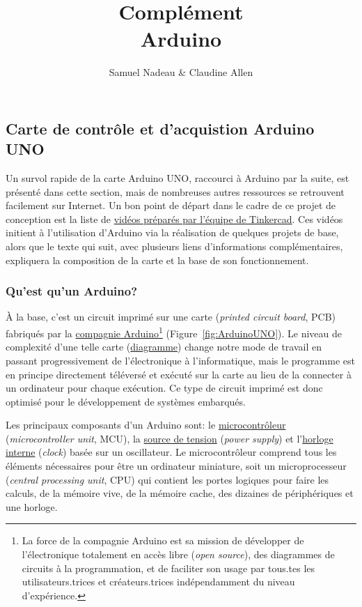 \documentclass[canadien,12pt,oneside,letterpaper]{article}
\begin{document}
\title{\textbf{Complément}\\Arduino}
\author{Samuel Nadeau \& Claudine Allen}
\date{}
\maketitle

\subsection*{Carte de contrôle et d'acquistion Arduino UNO}
Un survol rapide de la carte Arduino UNO, raccourci à Arduino par la suite, est présenté dans cette section, mais de nombreuses autres ressources se retrouvent facilement sur Internet. Un bon point de départ dans le cadre de ce projet de conception est la liste de \href{https://www.youtube.com/playlist?list=PLV6cmKvnKRs5geApVORPW79U6s3wpa0Ht}{vidéos préparés par l'équipe de Tinkercad}. Ces vidéos initient à l'utilisation d'Arduino via la réalisation de quelques projets de base, alors que le texte qui suit, avec plusieurs liens d'informations complémentaires, expliquera la composition de la carte et la base de son fonctionnement. 

\subsubsection*{Qu'est qu'un Arduino?}
À la base, c'est un circuit imprimé sur une carte (\textit{printed circuit board}, PCB) fabriqués par la \href{https://www.arduino.cc/}{ compagnie Arduino}\footnote{La force de la compagnie Arduino est sa mission de développer de l'électronique totalement en accès libre (\textit{open source}), des diagrammes de circuits à la programmation, et de faciliter son usage par tous.tes les utilisateurs.trices et créateurs.trices indépendamment du niveau d'expérience.} (Figure~\ref{fig:ArduinoUNO}). Le niveau de complexité d'une telle carte (\href{https://content.arduino.cc/assets/UNO-TH_Rev3e_sch.pdf}{diagramme}) change notre mode de travail en passant progressivement de l'électronique à l'informatique, mais le programme est en principe directement téléversé et exécuté sur la carte au lieu de la connecter à un ordinateur pour chaque exécution. Ce type de circuit imprimé est donc optimisé pour le développement de systèmes embarqués.

Les principaux composants d’un Arduino sont: le \href{https://en.wikipedia.org/wiki/Microcontroller}{microcontrôleur} (\textit{microcontroller unit}, MCU), la \href{https://electronics.stackexchange.com/questions/26484/how-arduino-power-supply-works}{source de tension} (\textit{power supply}) et l’\href{https://en.wikipedia.org/wiki/Clock_signal}{horloge interne} (\textit{clock}) basée sur un oscillateur. Le microcontrôleur comprend tous les éléments nécessaires pour être un ordinateur miniature, soit un microprocesseur (\textit{central processing unit}, CPU) qui contient les portes logiques pour faire les calculs, de la mémoire vive, de la mémoire cache, des dizaines de périphériques et une horloge.
\end{document}
